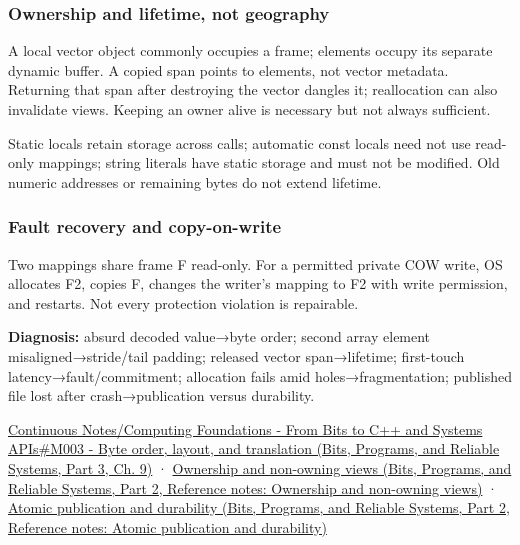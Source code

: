 \subsubsection{Ownership and lifetime, not geography}\label{appendix-92ff77d4dfdc-ownership-and-lifetime-not-geography}

\hypertarget{appendix-92ff77d4dfdc-ownership-and-lifetime-not-geography}{}

A local vector object commonly occupies a frame; elements occupy its separate dynamic buffer. A copied span points to elements, not vector metadata. Returning that span after destroying the vector dangles it; reallocation can also invalidate views. Keeping an owner alive is necessary but not always sufficient.

Static locals retain storage across calls; automatic const locals need not use read-only mappings; string literals have static storage and must not be modified. Old numeric addresses or remaining bytes do not extend lifetime.

\subsubsection{Fault recovery and copy-on-write}\label{appendix-92ff77d4dfdc-fault-recovery-and-copy-on-write}

\hypertarget{appendix-92ff77d4dfdc-fault-recovery-and-copy-on-write}{}

Two mappings share frame F read-only. For a permitted private COW write, OS allocates F2, copies F, changes the writer's mapping to F2 with write permission, and restarts. Not every protection violation is repairable.

\textbf{Diagnosis:} absurd decoded value→byte order; second array element misaligned→stride/tail padding; released vector span→lifetime; first-touch latency→fault/commitment; allocation fails amid holes→fragmentation; published file lost after crash→publication versus durability.

\href{../01-Bits-Programs-and-Reliable-Systems-P03/main.pdf\#01-foundations-i-ch011-m003---byte-order-layout-and-translation}{Continuous Notes/Computing Foundations - From Bits to C++ and Systems APIs\#M003 - Byte order, layout, and translation (Bits, Programs, and Reliable Systems, Part 3, Ch. 9)} · \href{../01-Bits-Programs-and-Reliable-Systems-P02/main.pdf\#appendix-d52e4486f527}{Ownership and non-owning views (Bits, Programs, and Reliable Systems, Part 2, Reference notes: Ownership and non-owning views)} · \href{../01-Bits-Programs-and-Reliable-Systems-P02/main.pdf\#appendix-e89a8f290ef5}{Atomic publication and durability (Bits, Programs, and Reliable Systems, Part 2, Reference notes: Atomic publication and durability)}

